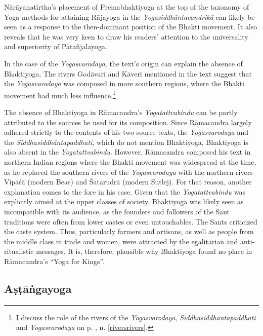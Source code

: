 Nārāyaṇatīrtha's placement of Premabhaktiyoga at the top of the taxonomy of Yoga methods for attaining Rājayoga in the \emph{Yogasiddhāntacandrikā} can likely be seen as a response to the then-dominant position of the Bhakti movement. It also reveals that he was very keen to draw his readers' attention to the universality and superiority of Pātañjalayoga.

In the case of the \emph{Yogasvarodaya}, the text's origin can explain the absence of Bhaktiyoga. The rivers Godāvarī and Kāverī mentioned in the text suggest that the \emph{Yogasvarodaya} was composed in more southern regions, where the Bhakti movement had much less influence.\footnote{I discuss the role of the rivers of the \emph{Yogasvarodaya}, \emph{Siddhasiddhāntapaddhati} and \emph{Yogasvarodaya} on p. \pageref{riversrivers}, n. \ref{riversrivers}.}

The absence of Bhaktiyoga in Rāmacandra's \emph{Yogatattvabindu} can be partly attributed to the sources he used for its composition. Since Rāmacandra largely adhered strictly to the contents of his two source texts, the \emph{Yogasvarodaya} and the \emph{Siddhasiddhāntapaddhati}, which do not mention Bhaktiyoga, Bhaktiyoga is also absent in the \emph{Yogatattvabindu}. However, Rāmacandra composed his text in northern Indian regions where the Bhakti movement was widespread at the time, as he replaced the southern rivers of the \emph{Yogasvarodaya} with the northern rivers Vipāśā (modern Beas) and Śatarudrā (modern Sutlej). For that reason, another explanation comes to the fore in his case. Given that the \emph{Yogatattvabindu} was explicitly aimed at the upper classes of society, Bhaktiyoga was likely seen as incompatible with its audience, as the founders and followers of the Sant traditions were often from lower castes or even untouchables. The Sants criticized the caste system. Thus, particularly farmers and artisans, as well as people from the middle class in trade and women, were attracted by the egalitarian and anti-ritualistic messages.  It is, therefore, plausible why Bhaktiyoga found no place in Rāmacandra's ``Yoga for Kings''. 

\subsection{Aṣṭāṅgayoga}
\label{ashtangayogacomplex}

